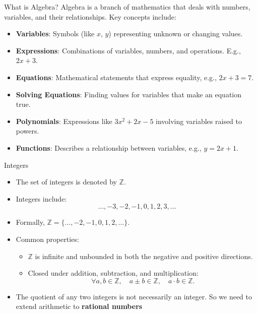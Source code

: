 \documentclass{beamer}
\begin{document}
  \begin{frame}{What is Algebra?}
    Algebra is a branch of mathematics that deals with numbers, variables, and their relationships. Key concepts include:
    \begin{itemize}
        \item \textbf{Variables}: Symbols (like \( x \), \( y \)) representing unknown or changing values.
        \item \textbf{Expressions}: Combinations of variables, numbers, and operations. E.g., \( 2x + 3 \).
        \item \textbf{Equations}: Mathematical statements that express equality, e.g., \( 2x + 3 = 7 \).
        \item \textbf{Solving Equations}: Finding values for variables that make an equation true.
        \item \textbf{Polynomials}: Expressions like \( 3x^2 + 2x - 5 \) involving variables raised to powers.
        \item \textbf{Functions}: Describes a relationship between variables, e.g., \( y = 2x + 1 \).
    \end{itemize}
\end{frame}
  \begin{frame}{Integers}
    \begin{itemize}
        \item The set of integers is denoted by \(\mathbb{Z}\).
        \item Integers include:
        \[
          \ldots, -3, -2, -1, 0, 1, 2, 3, \ldots
        \]
        \item Formally, \(\mathbb{Z} = \{\dots, -2, -1, 0, 1, 2, \dots\}\).
        \item Common properties:
        \begin{itemize}
            \item \(\mathbb{Z}\) is infinite and unbounded in both the negative and positive directions.
            \item Closed under addition, subtraction, and multiplication:
                \[
                  \forall a, b \in \mathbb{Z}, \quad
                  a \pm b \in \mathbb{Z}, \quad
                  a \cdot b \in \mathbb{Z}.
                \]
        \end{itemize}
        \item The quotient of any two integers is not necessarily an integer. So we need to extend arithmetic to \textbf{rational numbers}
    \end{itemize}
\end{frame}
\end{document}
